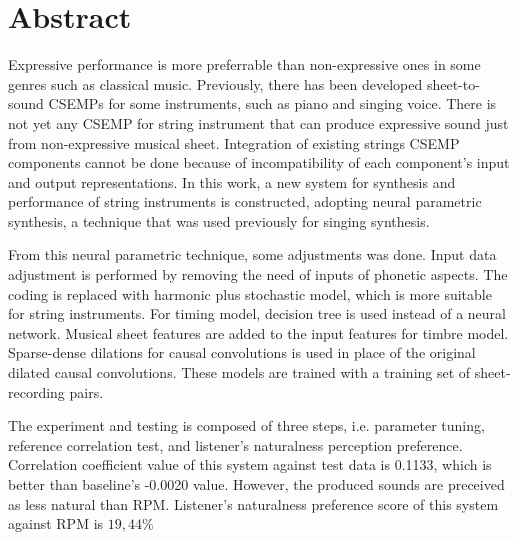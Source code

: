 \clearpage
\chapter*{Abstract}

Expressive performance is more preferrable than non-expressive ones in some genres such as classical music. Previously, there has been developed sheet-to-sound CSEMPs for some instruments, such as piano and singing voice. There is not yet any CSEMP for string instrument that can produce expressive sound just from non-expressive musical sheet. Integration of existing strings CSEMP components cannot be done because of incompatibility of each component's input and output representations. In this work, a new system for synthesis and performance of string instruments is constructed, adopting neural parametric synthesis, a technique that was used previously for singing synthesis.

From this neural parametric technique, some adjustments was done. Input data adjustment is performed by removing the need of inputs of phonetic aspects. The coding is replaced with harmonic plus stochastic model, which is more suitable for string instruments. For timing model, decision tree is used instead of a neural network. Musical sheet features are added to the input features for timbre model. Sparse-dense dilations for causal convolutions is used in place of the original dilated causal convolutions. These models are trained with a training set of sheet-recording pairs.

The experiment and testing is composed of three steps, i.e. parameter tuning, reference correlation test, and listener's naturalness perception preference. Correlation coefficient value of this system against test data is 0.1133, which is better than baseline's -0.0020 value. However, the produced sounds are preceived as less natural than RPM. Listener's naturalness preference score of this system against RPM is $19,44\%$

\clearpage
